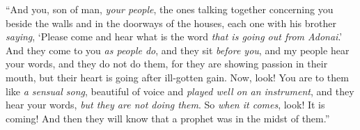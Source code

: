 \begin{biblechapter}
\verse “And you, son of man, \textit{your people}, the ones talking together concerning you beside the walls and in the doorways of the houses, each one with his brother \textit{saying}, ‘Please come and hear what is the word \textit{that is going out from Adonai}.’
\verse And they come to you \textit{as people do}, and they sit \textit{before you}, and my people hear your words, and they do not do them, for they are showing passion in their mouth, but their heart is going after ill-gotten gain.
\verse Now, look! You are to them like \textit{a sensual song}, beautiful of voice and \textit{played well on an instrument}, and they hear your words, \textit{but they are not doing them}.
\verse So \textit{when it comes}, look! It is coming! And then they will know that a prophet was in the midst of them.”
\end{biblechapter}


